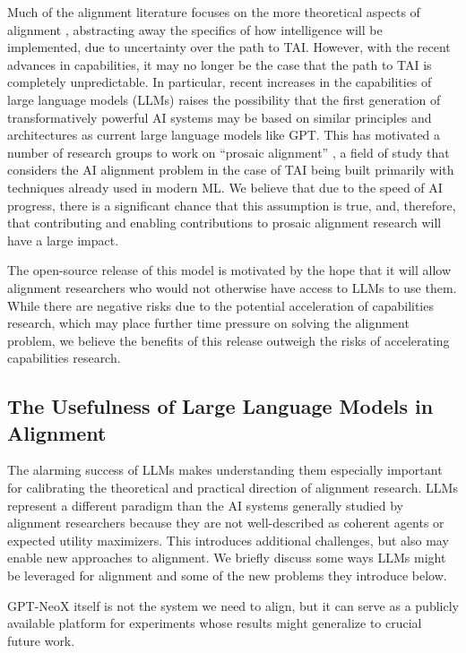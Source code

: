 \documentclass{article}
\begin{document}
Much of the alignment literature focuses on the more theoretical aspects of alignment \citep{demski2020embedded,yudkowsky2018functional,Taylor2016QuantilizersAS,Garrabrant2016LogicalI,Armstrong2018OccamsRI,hubinger2021rlo}, abstracting away the specifics of how intelligence will be implemented, due to uncertainty over the path to TAI. However, with the recent advances in capabilities, it may no longer be the case that the path to TAI is completely unpredictable. In particular, recent increases in the capabilities of large language models (LLMs) raises the possibility that the first generation of transformatively powerful AI systems may be based on similar principles and architectures as current large language models like GPT. This has motivated a number of research groups to work on “prosaic alignment” \citep{prosaic, askell2021general,instruct}, a field of study that considers the AI alignment problem in the case of TAI being built primarily with techniques already used in modern ML.
We believe that due to the speed of AI progress, there is a significant chance that this assumption is true, and, therefore, that contributing and enabling contributions to prosaic alignment research will have a large impact.

The open-source release of this model is motivated by the hope that it will allow alignment researchers who would not otherwise have access to LLMs to use them. While there are negative risks due to the potential acceleration of capabilities research, which may place further time pressure on solving the alignment problem, we believe the benefits of this release outweigh the risks of accelerating capabilities research.

\subsection{The Usefulness of Large Language Models in Alignment}

The alarming success of LLMs makes understanding them especially important for calibrating the theoretical and practical direction of alignment research. LLMs represent a different paradigm than the AI systems generally studied by alignment researchers because they are not well-described as coherent agents or expected utility maximizers. This introduces additional challenges, but also may enable new approaches to alignment. We briefly discuss some ways LLMs might be leveraged for alignment and some of the new problems they introduce below.

GPT-NeoX itself is not the system we need to align, but it can serve as a publicly available platform for experiments whose results might generalize to crucial future work. 
\end{document}
